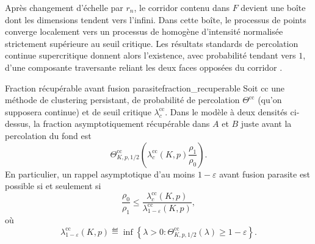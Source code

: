 \begin{Preuve}
Après changement d'échelle par $r_n$, le corridor contenu dans $F$ devient une boîte dont les dimensions tendent vers l'infini. Dans cette boîte, le processus de points converge localement vers un processus de  homogène d'intensité normalisée strictement supérieure au seuil critique. Les résultats standards de percolation continue supercritique donnent alors l'existence, avec probabilité tendant vers $1$, d'une composante traversante reliant les deux faces opposées du corridor \cite{MeesterRoy, penrose2003}.

\end{Preuve}

\begin{Theoreme}{Fraction récupérable avant fusion parasite}{fraction_recuperable}
Soit $\mathrm{cc}$ une méthode de clustering persistant, de probabilité de percolation $\Theta^{\mathrm{cc}}$ (qu'on supposera continue) et de seuil critique $\lambda_c^{\mathrm{cc}}$. Dans le modèle à deux densités ci-dessus, la fraction asymptotiquement récupérable dans $A$ et $B$ juste avant la percolation du fond est
\[
\boxed{
    \Theta^{\mathrm{cc}}_{K,p,1/2}\left(
        \lambda_c^{\mathrm{cc}}(K,p)\frac{\rho_1}{\rho_0}
    \right).
    }
\]
En particulier, un rappel asymptotique d'au moins $1-\varepsilon$ avant fusion parasite est possible si et seulement si
\[
\boxed{
    \frac{\rho_0}{\rho_1}
    \le
    \frac{\lambda_c^{\mathrm{cc}}(K,p)}
         {\lambda^{\mathrm{cc}}_{1-\varepsilon}(K,p)},
         }
\]
où
\[
    \lambda^{\mathrm{cc}}_{1-\varepsilon}(K,p)
    \eqdef
    \inf\left\{\lambda>0:
    \Theta^{\mathrm{cc}}_{K,p,1/2}(\lambda)\ge 1-\varepsilon
    \right\}.
\]
\end{Theoreme}

